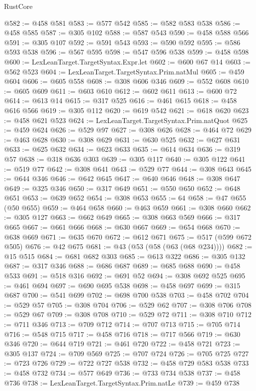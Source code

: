 \begin{lexlean}{RustCore}
\begin{coremodule}
@582 := @458 @581
@583 := @577 @542
@585 := @582 @583 @538
@586 := @458 @585
@587 := @305 @102
@588 := @587 @543
@590 := @458 @588 @566
@591 := @305 @107
@592 := @591 @543
@593 := @590 @592
@595 := @586 @593 @538
@596 := @567 @595
@598 := @547 @596 @538
@599 := @458 @598
@600 := LexLeanTarget.TargetSyntax.Expr.let
@602 := @600 @67 @14
@603 := @562 @523
@604 := LexLeanTarget.TargetSyntax.Prim.natMul
@605 := @459 @604
@606 := @605 @558
@608 := @308 @606 @346
@609 := @552 @608
@610 := @605 @609
@611 := @603 @610
@612 := @602 @611
@613 := @600 @72
@614 := @613 @14
@615 := @317 @525
@616 := @461 @615
@618 := @458 @616 @566
@619 := @305 @112
@620 := @619 @542
@621 := @618 @620
@623 := @458 @621 @523
@624 := LexLeanTarget.TargetSyntax.Prim.natQuot
@625 := @459 @624
@626 := @529 @97
@627 := @308 @626
@628 := @464 @72
@629 := @463 @628
@630 := @308 @629
@631 := @630 @525
@632 := @627 @631
@633 := @625 @632
@634 := @623 @633
@635 := @614 @634
@636 := @319 @57
@638 := @318 @636 @303
@639 := @305 @117
@640 := @305 @122
@641 := @519 @77
@642 := @308 @641
@643 := @529 @77
@644 := @308 @643
@645 := @644 @346
@646 := @642 @645
@647 := @640 @646
@648 := @308 @647
@649 := @325 @346
@650 := @317 @649
@651 := @550 @650
@652 := @648 @651
@653 := @639 @652
@654 := @308 @653
@655 := 64
@658 := @47 @655 (@50 @655)
@659 := @464 @658
@660 := @463 @659
@661 := @308 @660
@662 := @305 @127
@663 := @662 @649
@665 := @308 @663 @569
@666 := @317 @665
@667 := @661 @666
@668 := @630 @667
@669 := @654 @668
@670 := @638 @669
@671 := @635 @670
@672 := @612 @671
@675 := @517 (@599 @672 @505)
@676 := @42 @675
@681 := @43 (@53 (@58 (@63 (@68 @234))))
@682 := @15 @515
@684 := @681 @682 @303
@685 := @613 @322
@686 := @305 @132
@687 := @317 @346
@688 := @686 @687
@689 := @685 @688
@690 := @458 @533
@691 := @518 @316
@692 := @691 @52
@694 := @308 @692 @525
@695 := @461 @694
@697 := @690 @695 @538
@698 := @458 @697
@699 := @315 @687
@700 := @541 @699
@702 := @698 @700 @538
@703 := @458 @702
@704 := @529 @57
@705 := @308 @704
@706 := @529 @62
@707 := @308 @706
@708 := @529 @67
@709 := @308 @708
@710 := @529 @72
@711 := @308 @710
@712 := @711 @346
@713 := @709 @712
@714 := @707 @713
@715 := @705 @714
@716 := @548 @715
@717 := @458 @716
@718 := @717 @566
@719 := @630 @346
@720 := @644 @719
@721 := @461 @720
@722 := @458 @721
@723 := @305 @137
@724 := @709 @569
@725 := @707 @724
@726 := @705 @725
@727 := @723 @726
@729 := @722 @727 @538
@732 := @458 @729 @583 @538
@733 := @458 @732
@734 := @577 @649
@736 := @733 @734 @538
@737 := @458 @736
@738 := LexLeanTarget.TargetSyntax.Prim.natLe
@739 := @459 @738

\end{coremodule}
\end{lexlean}
